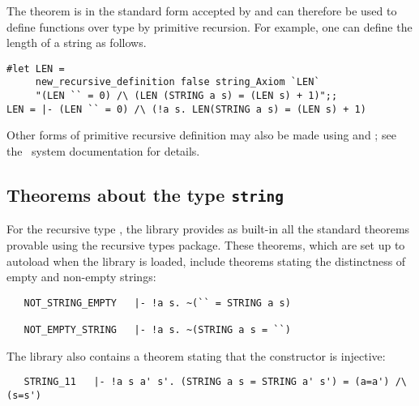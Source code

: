 The theorem  is in the standard form accepted by
 and can therefore be used to define functions
over type  by primitive recursion.  For example, one can define the
length of a string as follows.

\setcounter{sessioncount}{1}
\begin{session}\begin{verbatim}
#let LEN =
     new_recursive_definition false string_Axiom `LEN`
     "(LEN `` = 0) /\ (LEN (STRING a s) = (LEN s) + 1)";;
LEN = |- (LEN `` = 0) /\ (!a s. LEN(STRING a s) = (LEN s) + 1)
\end{verbatim}\end{session}

\noindent Other forms of primitive recursive definition may also be made using
 and ; see the \HOL\ system
documentation for details.%

\subsection{Theorems about the type {\tt string}}%

For the recursive type , the library provides as built-in all the
standard theorems provable using the recursive types package.  These theorems,
which are set up to autoload when the library is loaded, include theorems
stating the distinctness of empty and non-empty strings:

\begin{hol}
\begin{verbatim}
   NOT_STRING_EMPTY   |- !a s. ~(`` = STRING a s)

   NOT_EMPTY_STRING   |- !a s. ~(STRING a s = ``)
\end{verbatim}\end{hol}

\noindent The library also contains a theorem stating that the constructor
 is injective:

\begin{hol}
\begin{verbatim}
   STRING_11   |- !a s a' s'. (STRING a s = STRING a' s') = (a=a') /\ (s=s')
\end{verbatim}\end{hol}

